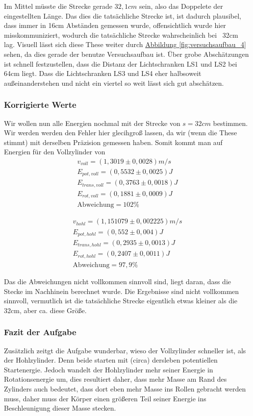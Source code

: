 Im Mittel müsste die Strecke gerade $32,1 cm$ sein, also das Doppelete der eingestellten Länge. Das dies die tatsächliche Strecke ist, ist dadurch plausibel, dass immer in 16cm Abständen gemessen wurde, offensichtlich wurde hier misskommuniziert, wodurch die tatsächliche Strecke wahrscheinlich bei ~32cm lag. Visuell lässt sich diese These weiter durch \hyperref[fig:versuchsaufbau_4]{Abbildung \ref*{fig:versuchsaufbau_4}} sehen, da dies gerade der benutze Versuchsaufbau ist. Über grobe Abschätzungen ist schnell festzustellen, dass die Distanz der Lichtschranken LS1 und LS2 bei 64cm liegt. Dass die Lichtschranken LS3 und LS4 eher halbsoweit außeinanderstehen und nicht ein viertel so weit lässt sich gut abschätzen. 

\subsubsection*{Korrigierte Werte}
Wir wollen nun alle Energien nochmal mit der Strecke von $s = 32cm$ bestimmen. Wir werden werden den Fehler hier glecihgroß lassen, da wir (wenn die These stimmt) mit derselben Präzision gemessen haben. Somit kommt man auf Energien für den Vollzylinder von
\begin{align}
    v_{voll} = (1,3019 \pm 0,0028) m/s \\
    E_{pot,voll} = (0,5532 \pm 0,0025) J \\
    E_{trans,voll} = (0,3763 \pm 0,0018) J \\
    E_{rot,voll} = (0,1881 \pm 0,0009) J \\
    \text{Abweichung} = 102\%
\end{align}


\begin{align}
    v_{hohl} = (1,151079 \pm 0,002225) m/s \\
    E_{pot,hohl} = (0,552 \pm 0,004) J \\
    E_{trans,hohl} = (0,2935 \pm 0,0013) J \\
    E_{rot,hohl} = (0,2407 \pm 0,0011) J \\
    \text{Abweichung} = 97,9\%
\end{align}

Das die Abweichungen nicht vollkommen sinnvoll sind, liegt daran, dass die Stecke im Nachhinein berechnet wurde. Die Ergebnisse sind nicht vollkommen sinnvoll, vermutlich ist die tatsächliche Strecke eigentlich etwas kleiner als die 32cm, aber ca. diese Größe.

\subsubsection*{Fazit der Aufgabe}
Zusätzlich zeitgt die Aufgabe wunderbar, wieso der Vollzylinder schneller ist, als der Hohlzylinder. Denn beide starten mit (circa) dersleben potentiellen Startenergie. Jedoch wandelt der Hohlzylinder mehr seiner Energie in Rotationsenergie um, dies resultiert daher, dass mehr Masse am Rand des Zylinders auch bedeutet, dass dort eben mehr Masse ins Rollen gebracht werden muss, daher muss der Körper einen größeren Teil seiner Energie ins Beschleunigung dieser Masse stecken.


